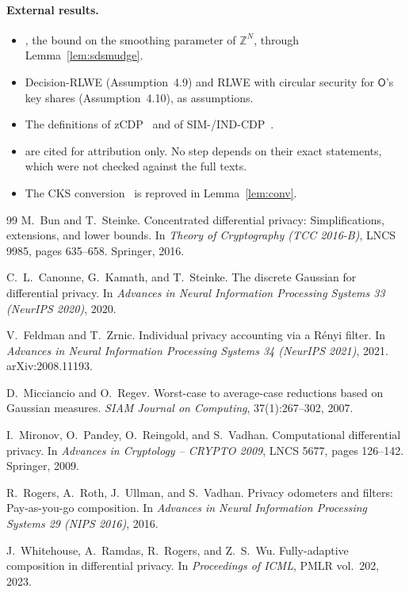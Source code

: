 \documentclass[11pt]{article}
\theoremstyle{definition}
\theoremstyle{plain}
\newcommand{\Op}{\mathsf{O}}
\newcommand{\Z}{\mathbb{Z}}
\begin{document}
\paragraph{External results.}
\begin{itemize}[nosep]
  \item \cite[Lemma~3.3]{MR07}, the bound on the smoothing parameter of $\Z^N$, through Lemma~\ref{lem:sdsmudge}.
  \item Decision-RLWE (Assumption~4.9) and RLWE with circular security for $\Op$'s key shares (Assumption~4.10), as assumptions.
  \item The definitions of zCDP~\cite{BS16} and of SIM-/IND-CDP~\cite{MPRV09}.
  \item \cite{RRUV16,FZ21,WRRW23} are cited for attribution only. No step depends on their exact statements, which were not checked against the full texts.
  \item The CKS conversion~\cite{CKS20} is reproved in Lemma~\ref{lem:conv}.
\end{itemize}

\begin{thebibliography}{99}\small
{}
M.~Bun and T.~Steinke.
\newblock Concentrated differential privacy: Simplifications, extensions, and lower bounds.
\newblock In \emph{Theory of Cryptography (TCC 2016-B)}, LNCS 9985, pages 635--658. Springer, 2016.

C.~L.~Canonne, G.~Kamath, and T.~Steinke.
\newblock The discrete Gaussian for differential privacy.
\newblock In \emph{Advances in Neural Information Processing Systems 33 (NeurIPS 2020)}, 2020.

V.~Feldman and T.~Zrnic.
\newblock Individual privacy accounting via a R\'enyi filter.
\newblock In \emph{Advances in Neural Information Processing Systems 34 (NeurIPS 2021)}, 2021. arXiv:2008.11193.

D.~Micciancio and O.~Regev.
\newblock Worst-case to average-case reductions based on Gaussian measures.
\newblock \emph{SIAM Journal on Computing}, 37(1):267--302, 2007.

I.~Mironov, O.~Pandey, O.~Reingold, and S.~Vadhan.
\newblock Computational differential privacy.
\newblock In \emph{Advances in Cryptology -- CRYPTO 2009}, LNCS 5677, pages 126--142. Springer, 2009.

R.~Rogers, A.~Roth, J.~Ullman, and S.~Vadhan.
\newblock Privacy odometers and filters: Pay-as-you-go composition.
\newblock In \emph{Advances in Neural Information Processing Systems 29 (NIPS 2016)}, 2016.

J.~Whitehouse, A.~Ramdas, R.~Rogers, and Z.~S.~Wu.
\newblock Fully-adaptive composition in differential privacy.
\newblock In \emph{Proceedings of ICML}, PMLR vol.~202, 2023.
\end{thebibliography}
\end{document}
